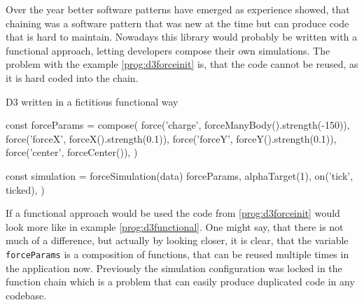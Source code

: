 Over the year better software patterns have emerged as experience showed, that chaining was a software pattern that was new at the time but can produce code that is hard to maintain. Nowadays this library would probably be written with a functional approach, letting developers compose their own simulations. The problem with the example \ref{prog:d3forceinit} is, that the code cannot be reused, as it is hard coded into the chain. 

\begin{program}
\caption{D3 written in a fictitious functional way}
\label{prog:d3functional}
\begin{JsCode}
const forceParams = compose(
  force('charge', forceManyBody().strength(-150)),
  force('forceX', forceX().strength(0.1)),
  force('forceY', forceY().strength(0.1)),
  force('center', forceCenter()),
)

const simulation = forceSimulation(data)
  forceParams,
  alphaTarget(1),
  on('tick', ticked),
)
\end{JsCode}
\end{program}

If a functional approach would be used the code from \ref{prog:d3forceinit} would look more like in example \ref{prog:d3functional}. One might say, that there is not much of a difference, but actually by looking closer, it is clear, that the variable \texttt{forceParams} is a composition of functions, that can be reused multiple times in the application now. Previously the simulation configuration was locked in the function chain which is a problem that can easily produce duplicated code in any codebase.

%
